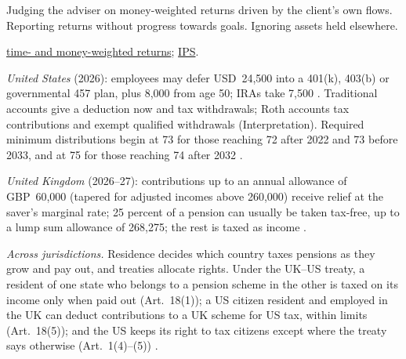 \begin{qfmethod}
 Judging the adviser on money-weighted returns driven by the client's own flows. Reporting returns without progress towards goals. Ignoring assets held elsewhere.

 \hyperref[def:return-measures]{time- and money-weighted returns}; \hyperref[meth:private-client-ips]{IPS}.

\end{qfmethod}

\begin{qfmethod}\label{meth:retirement-across-jurisdictions}
 \emph{United States} (2026): employees may defer USD~24,500 into a 401(k), 403(b) or governmental 457 plan, plus 8,000 from age 50; IRAs take 7,500 \citep[secs.~402(g), 414(v), 219(b)]{irs-notice-2025-67}. Traditional accounts give a deduction now and tax withdrawals; Roth accounts tax contributions and exempt qualified withdrawals (Interpretation). Required minimum distributions begin at 73 for those reaching 72 after 2022 and 73 before 2033, and at 75 for those reaching 74 after 2032 \citep[sec.~401(a)(9)(C)(v)]{us-internal-revenue-code-26}.

\emph{United Kingdom} (2026--27): contributions up to an annual allowance of GBP~60,000 (tapered for adjusted incomes above 260,000) receive relief at the saver's marginal rate; 25 percent of a pension can usually be taken tax-free, up to a lump sum allowance of 268,275; the rest is taxed as income \citep[annual allowance; lump sum allowance]{govuk-pension-tax-2026}.

\emph{Across jurisdictions.} Residence decides which country taxes pensions as they grow and pay out, and treaties allocate rights. Under the UK--US treaty, a resident of one state who belongs to a pension scheme in the other is taxed on its income only when paid out (Art.~18(1)); a US citizen resident and employed in the UK can deduct contributions to a UK scheme for US tax, within limits (Art.~18(5)); and the US keeps its right to tax citizens except where the treaty says otherwise (Art.~1(4)--(5)) \citep[Arts.~1(4)--(5), 4(4), 18]{uk-us-double-taxation-convention-2001}.


\end{qfmethod}
